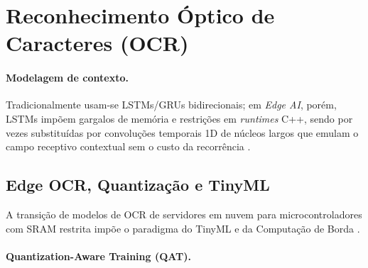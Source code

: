 \section{Reconhecimento Óptico de Caracteres (OCR)}
\label{sec:ocr}


\paragraph{Modelagem de contexto.}
Tradicionalmente usam-se LSTMs/GRUs bidirecionais; 
em \textit{Edge AI}, porém, LSTMs impõem gargalos de memória e restrições 
em \textit{runtimes} C++, sendo por vezes substituídas por convoluções 
temporais 1D de núcleos largos que emulam o campo receptivo contextual 
sem o custo da recorrência \cite{shi2017crnn}.  


\subsection{Edge OCR, Quantização e TinyML}
A transição de modelos de OCR de servidores em nuvem para microcontroladores com
SRAM restrita impõe o paradigma do TinyML e da Computação de Borda \cite{ademola2023resource}.

\paragraph{Quantization-Aware Training (QAT).}
